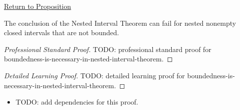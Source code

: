 \newpage
{}
\label{prf:boundedness-is-necessary-in-nested-interval-theorem}

\begin{remark*}[Return]
\hyperref[prop:boundedness-is-necessary-in-nested-interval-theorem]{Return to Proposition}
\end{remark*}

\begin{proposition*}
The conclusion of the Nested Interval Theorem can fail for nested nonempty
closed intervals that are not bounded.
\end{proposition*}

\begin{proof}[Professional Standard Proof]
\LRAProofBodyStart
TODO: professional standard proof for boundedness-is-necessary-in-nested-interval-theorem.
\end{proof}

\begin{proof}[Detailed Learning Proof]
\LRAProofBodyStart
TODO: detailed learning proof for boundedness-is-necessary-in-nested-interval-theorem.
\end{proof}

\begin{remark*}
\end{remark*}

\begin{dependencies}
\begin{itemize}
  \item TODO: add dependencies for this proof.
\end{itemize}
\end{dependencies}

\clearpage
